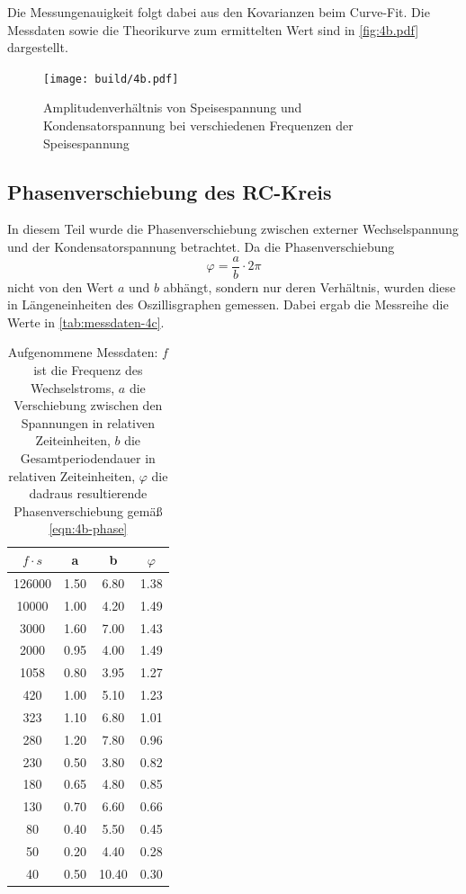Die Messungenauigkeit folgt dabei aus den Kovarianzen beim Curve-Fit. Die Messdaten sowie
die Theorikurve zum ermittelten Wert sind in  \autoref{fig:4b.pdf} dargestellt.

\begin{figure}[H]
	\centering
	\texttt{[image: build/4b.pdf]}
	\caption{Amplitudenverhältnis von Speisespannung und Kondensatorspannung bei
	verschiedenen Frequenzen der Speisespannung}
	\label{fig:4b.pdf}
\end{figure}

\subsection{Phasenverschiebung des RC-Kreis}
\label{sec:4c-auswertung}

In diesem Teil wurde die Phasenverschiebung zwischen externer Wechselspannung und der 
Kondensatorspannung betrachtet. Da die Phasenverschiebung
\begin{equation}
	\varphi = \frac{a}{b} \cdot 2\pi
	\label{eqn:4b-phase}
\end{equation}
nicht von den Wert $a$ und $b$ abhängt, sondern nur deren Verhältnis, wurden diese
in Längeneinheiten des Oszillisgraphen gemessen. Dabei ergab die Messreihe die Werte in 
\autoref{tab:messdaten-4c}.

\begin{table}
	\centering
	\caption{Aufgenommene Messdaten: $f$ ist die Frequenz des Wechselstroms, $a$ die 
	Verschiebung zwischen den Spannungen in relativen Zeiteinheiten, $b$ die
	Gesamtperiodendauer in relativen Zeiteinheiten, $\varphi$ die dadraus resultierende
	Phasenverschiebung gemäß \autoref{eqn:4b-phase}}
	\label{tab:messdaten-4c}
	\begin{tabular}{c c c c}
		\toprule
		$f \cdot \si{s}$ &  a & b & $\varphi$ \\
		\midrule
		126000	&  1.50  &	 6.80  &	1.38 \\
		 10000	&  1.00  &	 4.20  &	1.49 \\
		  3000	&  1.60  &	 7.00  &	1.43 \\
		  2000	&  0.95  &	 4.00  &	1.49 \\
		1058  	&  0.80  &	 3.95  &	1.27 \\
		   420	&  1.00  &	 5.10  &	1.23 \\
		   323	&  1.10  &	 6.80  &	1.01 \\
		   280	&  1.20  &	 7.80  &	0.96 \\
		   230	&  0.50  &	 3.80  &	0.82 \\
		   180	&  0.65  &	 4.80  &	0.85 \\
		   130	&  0.70  &	 6.60  &	0.66 \\
		    80	&  0.40  &	 5.50  &	0.45 \\
		    50	&  0.20  &	 4.40  &	0.28 \\
		    40	&  0.50  &	10.40  &	0.30 \\
		\bottomrule
	\end{tabular}
\end{table}

